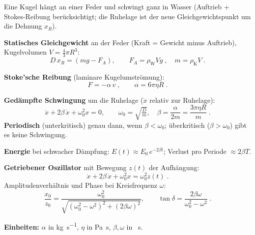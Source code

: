 

Eine Kugel hängt an einer Feder und schwingt ganz in Wasser
(Auftrieb + Stokes-Reibung berücksichtigt; die Ruhelage ist der neue
Gleichgewichtspunkt um die Dehnung $x_R$).

\begin{werkzeugkasten}[Werkzeuge]
\textbf{Statisches Gleichgewicht} an der Feder (Kraft = Gewicht minus
Auftrieb), Kugelvolumen $V=\frac43\pi R^3$:
\begin{equation}
  D\,x_R=(m g-F_A),\qquad F_A=\rho_{\mathrm W}V g\;,
  \quad m=\rho_{\mathrm K}V\;.
\end{equation}

\textbf{Stoke'sche Reibung} (laminare Kugelumströmung):
\begin{equation}
  F=-\alpha\, v\;,\qquad \alpha=6\pi\eta R\;.
\end{equation}

\textbf{Gedämpfte Schwingung} um die Ruhelage ($\ddot x$ relativ zur Ruhelage):
\begin{equation}
  \ddot x+2\beta\,\dot x+\omega_0^2 x=0,\qquad
  \omega_0=\sqrt{\tfrac{D}{m}},\quad
  \beta=\frac{\alpha}{2m}=\frac{3\pi\eta R}{m}\;.
\end{equation}
\textbf{Periodisch} (unterkritisch) genau dann, wenn $\beta<\omega_0$;
überkritisch ($\beta>\omega_0$) gibt es keine Schwingung.

\textbf{Energie} bei schwacher Dämpfung: $E(t)\approx E_0\,e^{-2\beta t}$;
Verlust pro Periode $\approx 2\beta T$.

\textbf{Getriebener Oszillator} mit Bewegung $z(t)$ der Aufhängung:
\begin{equation}
  \ddot x+2\beta\,\dot x+\omega_0^2 x=\omega_0^2 z(t)\;.
\end{equation}
Amplitudenverhältnis und Phase bei Kreisfrequenz $\omega$:
\begin{equation}
  \frac{x_0}{z_0}=\frac{\omega_0^2}{\sqrt{(\omega_0^2-\omega^2)^2+(2\beta\omega)^2}},
  \qquad \tan\delta=\frac{2\beta\omega}{\omega_0^2-\omega^2}\;.
\end{equation}

\textbf{Einheiten:} $\alpha$ in \unit{\kilogram\per\second},
$\eta$ in \unit{\pascal\second}, $\beta,\omega$ in \unit{\per\second}.
\end{werkzeugkasten}

